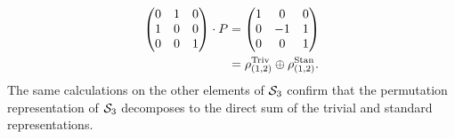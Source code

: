 \begin{example}
\begin{align*}
\begin{pmatrix}
				0&1&0 \\ 1&0&0 \\ 0&0&1
			\end{pmatrix} \cdot  P
			&= \begin{pmatrix}
				1&0&0 \\ 0&-1&1 \\ 0&0&1
			\end{pmatrix}\\
			&= \rho_{(1,2)}^{\text{Triv}} \oplus \rho_{(1,2)}^{\text{Stan}}.
		\end{align*}
		The same calculations on the other elements of $\mathcal{S}_3$ confirm that the permutation representation of $\mathcal{S}_3$ decomposes to the direct sum of the trivial and standard representations.
\end{example}
